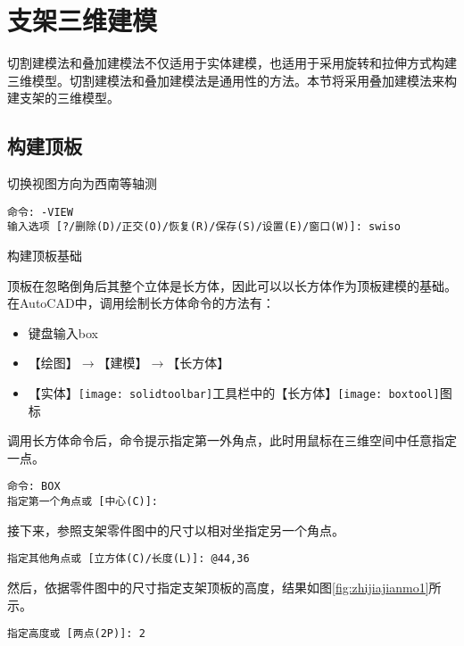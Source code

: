 \section{支架三维建模}

切割建模法和叠加建模法不仅适用于实体建模，也适用于采用旋转和拉伸方式构建三维模型。切割建模法和叠加建模法是通用性的方法。本节将采用叠加建模法来构建支架的三维模型。

\subsection{构建顶板}
\begin{procedure}
\item 切换视图方向为西南等轴测

\begin{lstlisting}
命令: -VIEW
输入选项 [?/删除(D)/正交(O)/恢复(R)/保存(S)/设置(E)/窗口(W)]: swiso
\end{lstlisting}

\item 构建顶板基础

顶板在忽略倒角后其整个立体是长方体，因此可以以长方体作为顶板建模的基础。在AutoCAD中，调用绘制长方体命令的方法有：
\begin{itemize}
\item 键盘输入box
\item 【绘图】$\rightarrow $【建模】$\rightarrow $【长方体】
\item 【实体】\texttt{[image: solidtoolbar]}工具栏中的【长方体】\texttt{[image: boxtool]}图标
\end{itemize}

调用长方体命令后，命令提示指定第一外角点，此时用鼠标在三维空间中任意指定一点。
\begin{lstlisting}
命令: BOX
指定第一个角点或 [中心(C)]:
\end{lstlisting}

接下来，参照支架零件图中的尺寸以相对坐指定另一个角点。
\begin{lstlisting}
指定其他角点或 [立方体(C)/长度(L)]: @44,36
\end{lstlisting}

然后，依据零件图中的尺寸指定支架顶板的高度，结果如图\ref{fig:zhijiajianmo1}所示。

\begin{lstlisting}
指定高度或 [两点(2P)]: 2
\end{lstlisting}


\end{procedure}
